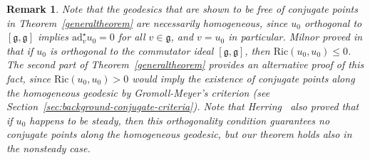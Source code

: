 \documentclass[oneside, 11pt]{amsart}
\newtheorem{remark}[theorem]{Remark}
\numberwithin{equation}{section}
\newcommand{\ad}{\mathrm{ad}}
\newcommand{\adstar}{\ad^{\star}}
\newcommand{\g}{\mathfrak{g}}
\begin{document}
\begin{remark}
Note that the geodesics that are shown to be free of conjugate points in Theorem~\ref{generaltheorem} are necessarily homogeneous, since $u_0$ orthogonal to $[\mathfrak{g}, \mathfrak{g}]$ implies $\adstar_vu_0=0$ for all $v\in\g$, and $v=u_0$ in particular. Milnor proved in \cite{Milnor} that if $u_0$ is orthogonal to the commutator ideal $[\mathfrak{g}, \mathfrak{g}]$, then $\mathrm{Ric}(u_0, u_0) \leq 0$. The second part of Theorem~\ref{generaltheorem} provides an alternative proof of this fact, since $\mathrm{Ric}(u_0, u_0) > 0$ would imply the existence of conjugate points along the homogeneous geodesic by Gromoll-Meyer's criterion (see Section~\ref{sec:background-conjugate-criteria}). Note that Herring~\cite{herring} also proved that if $u_0$ happens to be \emph{steady}, then this orthogonality condition guarantees no conjugate points along the homogeneous geodesic, but our theorem holds also in the nonsteady case.
\end{remark}
 
\end{document}
